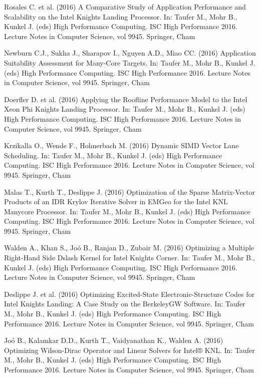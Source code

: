 \documentclass[
11pt,%
tightenlines,%
twoside,%
onecolumn,%
nofloats,%
nobibnotes,%
nofootinbib,%
superscriptaddress,%
noshowpacs,%
centertags]%
{revtex4}
\begin{document}
\begin{thebibliography}{99}

Rosales C. et al. (2016) A Comparative Study of Application Performance and Scalability on the Intel Knights Landing Processor. In: Taufer M., Mohr B., Kunkel J. (eds) High Performance Computing. ISC High Performance 2016. Lecture Notes in Computer Science, vol 9945. Springer, Cham

Newburn C.J., Sukha J., Sharapov I., Nguyen A.D., Miao CC. (2016) Application Suitability Assessment for Many-Core Targets. In: Taufer M., Mohr B., Kunkel J. (eds) High Performance Computing. ISC High Performance 2016. Lecture Notes in Computer Science, vol 9945. Springer, Cham

Doerfler D. et al. (2016) Applying the Roofline Performance Model to the Intel Xeon Phi Knights Landing Processor. In: Taufer M., Mohr B., Kunkel J. (eds) High Performance Computing. ISC High Performance 2016. Lecture Notes in Computer Science, vol 9945. Springer, Cham

Krzikalla O., Wende F., Hohnerbach M. (2016) Dynamic SIMD Vector Lane Scheduling. In: Taufer M., Mohr B., Kunkel J. (eds) High Performance Computing. ISC High Performance 2016. Lecture Notes in Computer Science, vol 9945. Springer, Cham

Malas T., Kurth T., Deslippe J. (2016) Optimization of the Sparse Matrix-Vector Products of an IDR Krylov Iterative Solver in EMGeo for the Intel KNL Manycore Processor. In: Taufer M., Mohr B., Kunkel J. (eds) High Performance Computing. ISC High Performance 2016. Lecture Notes in Computer Science, vol 9945. Springer, Cham

Walden A., Khan S., Joó B., Ranjan D., Zubair M. (2016) Optimizing a Multiple Right-Hand Side Dslash Kernel for Intel Knights Corner. In: Taufer M., Mohr B., Kunkel J. (eds) High Performance Computing. ISC High Performance 2016. Lecture Notes in Computer Science, vol 9945. Springer, Cham

Deslippe J. et al. (2016) Optimizing Excited-State Electronic-Structure Codes for Intel Knights Landing: A Case Study on the BerkeleyGW Software. In: Taufer M., Mohr B., Kunkel J. (eds) High Performance Computing. ISC High Performance 2016. Lecture Notes in Computer Science, vol 9945. Springer, Cham

Joó B., Kalamkar D.D., Kurth T., Vaidyanathan K., Walden A. (2016) Optimizing Wilson-Dirac Operator and Linear Solvers for Intel® KNL. In: Taufer M., Mohr B., Kunkel J. (eds) High Performance Computing. ISC High Performance 2016. Lecture Notes in Computer Science, vol 9945. Springer, Cham


\end{thebibliography}
\end{document}
